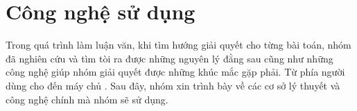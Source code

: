 \chapter{Công nghệ sử dụng}\label{chap:Tech}
		Trong quá trình làm luận văn, khi tìm hướng giải quyết cho từng bài toán, nhóm đã
		nghiên cứu và tìm tòi ra được những nguyên lý đằng sau cũng như những công nghệ giúp
		nhóm giải quyết được những khúc mắc gặp phải. Từ phía người dùng cho đến máy chủ
		. Sau đây, nhóm xin trình
		bày về các cơ sở lý thuyết và công nghệ chính mà nhóm sẽ sử dụng.
		
	
	
	